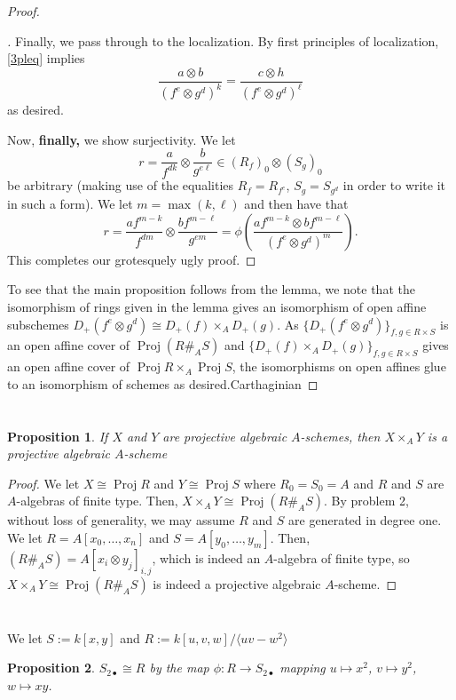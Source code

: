 \documentclass[english,letter,doublesided]{article}
\newcommand{\ldt}{\bullet}
\newenvironment{subproof}[1][\proofname]{%
	\renewcommand{\qedsymbol}{$\blacksquare$}%
	\begin{proof}[#1]%
	}{%
	\end{proof}%
}
\newcommand{\prob}[1]{\setcounter{section}{#1-1}\section{}}
\newtheorem*{prop*}{Proposition}
\theoremstyle{remark}
\theoremstyle{definition}
\newcommand{\idl}[1]{\langle #1 \rangle}
\DeclareMathOperator{\proj}{Proj}
\begin{document}
\begin{proof}
\begin{subproof}
			Finally, we pass through to the localization. By first principles of localization, \eqref{3pleq} implies \begin{equation*}
			\frac{a\otimes b}{(f^e\otimes g^d)^k}=\frac{c\otimes h}{(f^e\otimes g^d)^\ell}
			\end{equation*} as desired.
			
			Now, \textbf{finally,} we show surjectivity. We let $$r=\frac{a}{f^{dk}}\otimes \frac{b}{g^{e\ell}}\in (R_f)_0\otimes (S_g)_0$$ be arbitrary (making use of the equalities $R_f=R_{f^e}$, $S_g=S_{g^d}$ in order to write it in such a form). We let $m=\max(k,\ell)$ and then have that $$r=\frac{af^{m-k}}{f^{dm}}\otimes \frac{bf^{m-\ell}}{g^{em}}=\phi\left(\frac{af^{m-k}\otimes bf^{m-\ell}}{(f^e\otimes g^d)^m}\right).$$ This completes our grotesquely ugly proof.
		\end{subproof}
		To see that the main proposition follows from the lemma, we note that the isomorphism of rings given in the lemma gives an isomorphism of open affine subschemes $D_+(f^e\otimes g^d)\cong D_+(f)\times_AD_+(g)$. As $\{D_+(f^e\otimes g^d)\}_{f,g\in R\times S}$ is an open affine cover of $\proj(R\#_A S)$ and $\{D_+(f)\times_AD_+(g)\}_{f,g\in R\times S}$ gives an open affine cover of $\proj R\times_A\proj S$, the isomorphisms on open affines glue to an isomorphism of schemes as desired.Carthaginian
	\end{proof}
	\prob{4}\begin{prop*}
		If $X$ and $Y$ are projective algebraic $A$-schemes, then $X\times_A Y$ is a projective algebraic $A$-scheme
	\end{prop*}
\begin{proof}
	We let $X\cong \proj R$ and $Y\cong \proj S$ where $R_0=S_0=A$ and $R$ and $S$ are $A$-algebras of finite type. Then, $X\times_A Y\cong \proj (R\#_A S)$. By problem 2, without loss of generality, we may assume $R$ and $S$ are generated in degree one. We let $R=A[x_0,\dots,x_n]$ and $S=A[y_0,\dots,y_m]$. Then, $(R\#_AS)=A[x_i\otimes y_j]_{i,j}$, which is indeed an $A$-algebra of finite type, so $X\times_A Y\cong \proj (R\#_A S)$ is indeed a projective algebraic $A$-scheme.
\end{proof}
	\prob{5}We let $S:=k[x,y]$ and $R:=k[u,v,w]/\idl{uv-w^2}$
	\begin{prop*}
		$S_{2\ldt}\cong R$ by the map $\phi:R\to S_{2\ldt}$ mapping $u\mapsto x^2$, $v\mapsto y^2$, $w\mapsto xy$. 
	\end{prop*}
\end{document}

